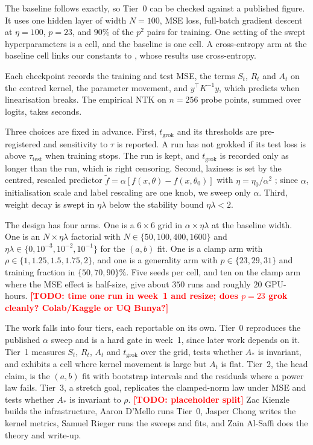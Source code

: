\documentclass[a4paper,11pt]{article} %
\newcommand{\TODO}[1]{\textcolor{red}{\textbf{[TODO: #1]}}}
\newcommand{\tgrok}{t_{\mathrm{grok}}}
\begin{document}
The baseline follows \citet[App.~8.3, arXiv v3]{kumar2024grokking} exactly, so
Tier~0 can be checked against a published figure. It uses one hidden layer of
width $N=100$, MSE loss, full-batch gradient descent at $\eta=100$, $p=23$, and
$90\%$ of the $p^2$ pairs for training. One setting of the swept
hyperparameters is a cell, and the baseline is one cell. A cross-entropy arm
at the baseline cell links our constants to \citet{truong2026norm}, whose
results use cross-entropy.

Each checkpoint records the training and test MSE, the terms $S_t$, $R_t$ and
$A_t$ on the centred kernel, the parameter movement, and $y^\top K^{-1}y$,
which predicts when linearisation breaks. The empirical NTK
on $n=256$ probe points, summed over logits, takes seconds.

Three choices are fixed in advance. First, $\tgrok$ and its thresholds are
pre-registered and sensitivity to $\tau$ is reported. A run has not grokked
if its test loss is above $\tau_{\mathrm{test}}$ when training stops. The run
is kept, and $\tgrok$ is recorded only as longer than the run, which is right
censoring. Second, laziness is set by the centred,
rescaled predictor $\tilde f=\alpha[f(x,\theta)-f(x,\theta_0)]$ with
$\eta=\eta_0/\alpha^2$ \citep{chizat2019lazy}; since $\alpha$, initialisation
scale and label rescaling are one knob, we sweep only $\alpha$. Third,
weight decay is swept in $\eta\lambda$ below the stability bound
$\eta\lambda<2$.

The design has four arms. One is a $6\times6$ grid in
$\alpha\times\eta\lambda$ at the baseline width. One is an $N\times\eta\lambda$
factorial with $N\in\{50,100,400,1600\}$ and
$\eta\lambda\in\{0,10^{-3},10^{-2},10^{-1}\}$ for the $(a,b)$ fit. One is a
clamp arm with $\rho\in\{1,1.25,1.5,1.75,2\}$, and one is a generality arm with
$p\in\{23,29,31\}$ and training fraction in $\{50,70,90\}\%$. Five seeds per
cell, and ten on the clamp arm where the MSE effect is half-size, give about
$350$ runs and roughly $20$ GPU-hours. \TODO{time one run in week~1 and resize;
does $p=23$ grok cleanly? Colab/Kaggle or UQ Bunya?}

The work falls into four tiers, each reportable on its own. Tier~0
reproduces the published $\alpha$ sweep and is a hard gate in week~1, since
later work depends on it. Tier~1 measures $S_t$, $R_t$, $A_t$
and $\tgrok$ over the grid, tests whether $A_*$ is invariant, and exhibits a
cell where kernel movement is large but $A_t$ is flat. Tier~2, the head claim,
is the $(a,b)$ fit with bootstrap intervals and the residuals where a power law
fails. Tier~3, a stretch goal, replicates the clamped-norm law under MSE and
tests whether $A_*$ is invariant to $\rho$.
\TODO{placeholder split} Zac Kienzle builds the infrastructure, Aaron D'Mello
runs Tier~0, Jasper Chong writes the kernel metrics, Samuel Rieger runs the
sweeps and fits, and Zain Al-Saffi does the theory and write-up.
\end{document}
